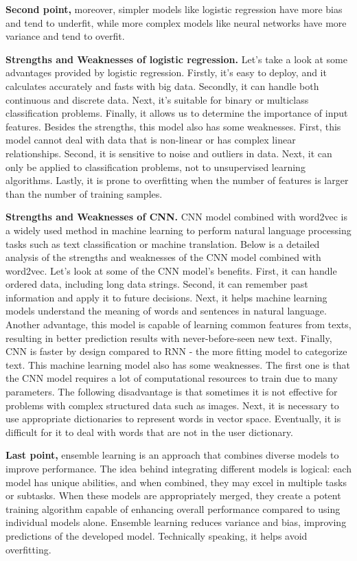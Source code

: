 \textbf{Second point,} moreover, simpler models like logistic regression have more bias and tend to underfit, while more complex models like neural networks have more variance and tend to overfit.

\textbf{Strengths and Weaknesses of logistic regression.} 
Let's take a look at some advantages provided by logistic regression. Firstly, it's easy to deploy, and it calculates accurately and fasts with big data. Secondly, it can handle both continuous and discrete data. Next, it's suitable for binary or multiclass classification problems. Finally, it allows us to determine the importance of input features. Besides the strengths, this model also has some weaknesses.
First, this model cannot deal with data that is non-linear or has complex linear relationships. Second, it is sensitive to noise and outliers in data. Next, it can only be applied to classification problems, not to unsupervised learning algorithms. Lastly, it is prone to overfitting when the number of features is larger than the number of training samples.

\textbf{Strengths and Weaknesses of CNN.} 
CNN model combined with word2vec is a widely used method in machine learning to perform natural language processing tasks such as text classification or machine translation. Below is a detailed analysis of the strengths and weaknesses of the CNN model combined with word2vec.
Let's look at some of the CNN model's benefits. First, it can handle ordered data, including long data strings. Second, it can remember past information and apply it to future decisions. Next, it helps machine learning models understand the meaning of words and sentences in natural language. Another advantage, this model is capable of learning common features from texts, resulting in better prediction results with never-before-seen new text. Finally, CNN is faster by design compared to RNN - the more fitting model to categorize text. This machine learning model also has some weaknesses. The first one is that the CNN model requires a lot of computational resources to train due to many parameters. The following disadvantage is that sometimes it is not effective for problems with complex structured data such as images. Next, it is necessary to use appropriate dictionaries to represent words in vector space. Eventually, it is difficult for it to deal with words that are not in the user dictionary. 

\textbf{Last point,}
ensemble learning is an approach that combines diverse models to improve performance. The idea behind integrating different models is logical: each model has unique abilities, and when combined, they may excel in multiple tasks or subtasks. When these models are appropriately merged, they create a potent training algorithm capable of enhancing overall performance compared to using individual models alone.
Ensemble learning reduces variance and bias, improving predictions of the developed model. Technically speaking, it helps avoid overfitting.

